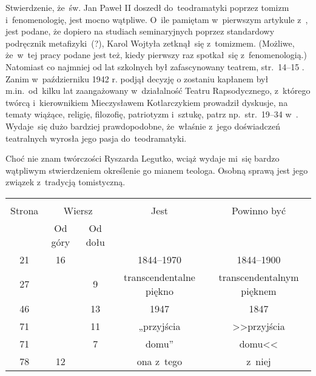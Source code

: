 \documentclass[a4paper,11pt]{article}
\begin{document}
\vspace{\spaceTwo}










\start {} Stwierdzenie, że~św. Jan Paweł II doszedł
do~teodramatyki poprzez tomizm i~fenomenologię, jest mocno wątpliwe.
O~ile pamiętam w~pierwszym artykule z~\cite{PoslugaMysleniaTomIX2011},
jest podane, że dopiero na studiach seminaryjnych poprzez standardowy
podręcznik metafizyki~(?), Karol Wojtyła zetknął~się z~tomizmem.
(Możliwe, że~w~tej pracy podane jest też, kiedy pierwszy raz
spotkał~się z~fenomenologią.) Natomiast co najmniej od lat szkolnych
był zafascynowany teatrem, str.~14--15
\cite{NowakJanPawelIIKronikaZyciaIPontyfikatu2015}. Zanim
w~październiku 1942 r. podjął decyzję o zostaniu kapłanem był
m.in.~od~kilku lat zaangażowany w~działalność Teatru Rapsodycznego,
z~którego twórcą i~kierownikiem Mieczysławem Kotlarczykiem prowadził
dyskusje, na tematy wiążące, religię, filozofię, patriotyzm i~sztukę,
patrz np.~str.~19--34
w~\cite{NowakJanPawelIIKronikaZyciaIPontyfikatu2015}. Wydaje~się dużo
bardziej prawdopodobne, że~właśnie z~jego doświadczeń teatralnych
wyrosła jego pasja do~teodramatyki.

\vspace{\spaceFour}


\start {} Choć nie znam twórczości Ryszarda Legutko, wciąż
wydaje mi~się bardzo wątpliwym stwierdzeniem określenie go mianem
teologa. Osobną sprawą jest jego związek z~tradycją tomistyczną.


\begin{center}

  \begin{tabular}{|c|c|c|c|c|}
    \hline
    & \multicolumn{2}{c|}{} & & \\
    Strona & \multicolumn{2}{c|}{Wiersz} & Jest
                              & Powinno być \\ \cline{2-3}
    & Od góry & Od dołu & & \\
    \hline
    21  & 16 & & 1844--1970 & 1844--1900 \\
    27  & &  9 & transcendentalne piękno & transcendentalnym pięknem \\
    46  & & 13 & 1947 & 1847 \\
    71  & & 11 & „przyjścia & >>przyjścia \\
    71  & &  7 & domu” & domu<< \\
    78  & 12 & & ona z~tego & z~niej \\
    \hline
  \end{tabular}

\end{center}
\end{document}

